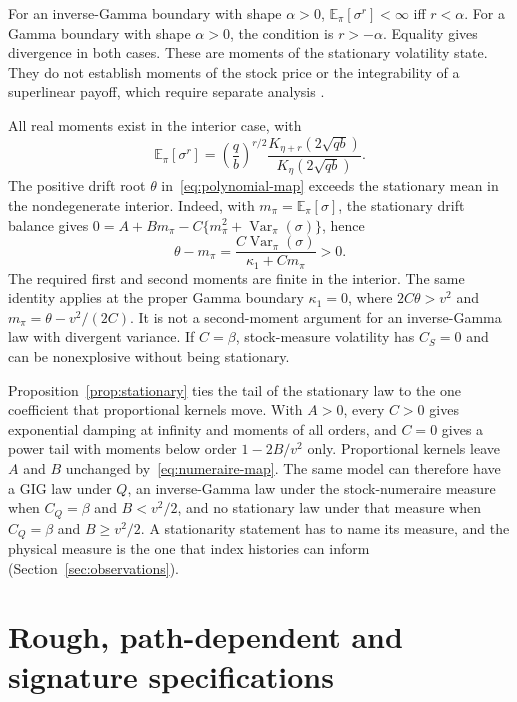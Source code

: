 \documentclass[11pt,a4paper]{article}
\theoremstyle{definition}
\theoremstyle{remark}
\newcommand{\E}{\mathbb{E}}
\DeclareMathOperator{\Var}{Var}
\begin{document}
For an inverse-Gamma boundary with shape \(\alpha>0\), \(\E_\pi[\sigma^r]<\infty\) iff \(r<\alpha\). For a Gamma boundary with shape \(\alpha>0\), the condition is \(r>-\alpha\). Equality gives divergence in both cases. These are moments of the stationary volatility state. They do not establish moments of the stock price or the integrability of a superlinear payoff, which require separate analysis \citep[Proposition~4.2]{CarrWillems2019}.

All real moments exist in the interior case, with
\begin{equation}
 \E_\pi[\sigma^r]=
 \left(\frac qb\right)^{r/2}
 \frac{K_{\eta+r}(2\sqrt{qb})}{K_\eta(2\sqrt{qb})}.
 \label{eq:gig-moments}
\end{equation}
The positive drift root \(\theta\) in~\eqref{eq:polynomial-map} exceeds the stationary mean in the nondegenerate interior. Indeed, with \(m_\pi=\E_\pi[\sigma]\), the stationary drift balance gives \(0=A+Bm_\pi-C\{m_\pi^2+\Var_\pi(\sigma)\}\), hence
\begin{equation}
 \theta-m_\pi=\frac{C\Var_\pi(\sigma)}{\kappa_1+Cm_\pi}>0.
 \label{eq:stationary-mean-gap}
\end{equation}
The required first and second moments are finite in the interior. The same identity applies at the proper Gamma boundary \(\kappa_1=0\), where \(2C\theta>v^2\) and \(m_\pi=\theta-v^2/(2C)\). It is not a second-moment argument for an inverse-Gamma law with divergent variance. If \(C=\beta\), stock-measure volatility has \(C_S=0\) and can be nonexplosive without being stationary.

Proposition~\ref{prop:stationary} ties the tail of the stationary law to the one coefficient that proportional kernels move. With \(A>0\), every \(C>0\) gives exponential damping at infinity and moments of all orders, and \(C=0\) gives a power tail with moments below order \(1-2B/v^2\) only. Proportional kernels leave \(A\) and \(B\) unchanged by~\eqref{eq:numeraire-map}. The same model can therefore have a GIG law under \(Q\), an inverse-Gamma law under the stock-numeraire measure when \(C_Q=\beta\) and \(B<v^2/2\), and no stationary law under that measure when \(C_Q=\beta\) and \(B\geq v^2/2\). A stationarity statement has to name its measure, and the physical measure is the one that index histories can inform (Section~\ref{sec:observations}).

\section{Rough, path-dependent and signature specifications}
\label{sec:nonmarkov}
\end{document}
